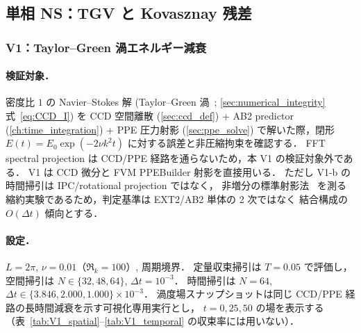 %
\subsection{単相 NS：TGV と Kovasznay 残差}
\label{sec:single_phase_ns}

\subsubsection{V1：Taylor--Green 渦エネルギー減衰}
\label{sec:energy_conservation}

\paragraph{検証対象．}
密度比 $1$ の Navier--Stokes 解 (Taylor--Green 渦~\cite{Brachet1983}; \autoref{sec:numerical_integrity} 式~\eqref{eq:CCD_I})
を CCD 空間離散 (\autoref{sec:ccd_def}) + AB2 predictor (\autoref{ch:time_integration}) +
PPE 圧力射影 (\autoref{sec:ppe_solve}) で解いた際，閉形 $E(t) = E_0 \exp(-2\nu k^2 t)$
に対する誤差と非圧縮拘束を確認する．
FFT spectral projection は CCD/PPE 経路を通らないため，本 V1 の検証対象外である．
V1 は CCD 微分と FVM PPEBuilder 射影を直接用いる．
ただし V1-b の時間掃引は IPC/rotational projection ではなく，
非増分の標準射影法~\cite{Chorin1968,BrownCortezMinion2001,Guermond2006} を測る
縮約実験であるため，判定基準は EXT2/AB2 単体の 2 次ではなく
結合構成の $O(\Delta t)$ 傾向とする．

\paragraph{設定．}
$L=2\pi$, $\nu = 0.01$（$\Re_k = 100$）, 周期境界．
定量収束掃引は $T = 0.05$ で評価し，
空間掃引は $N\in\{32,48,64\}$, $\Delta t=10^{-3}$．
時間掃引は $N=64$, $\Delta t\in\{3.846,2.000,1.000\}\times10^{-3}$．
渦度場スナップショットは同じ CCD/PPE 経路の長時間減衰を示す可視化専用実行とし，
$t=0,25,50$ の場を表示する（表~\ref{tab:V1_spatial}--\ref{tab:V1_temporal} の収束率には用いない）．


